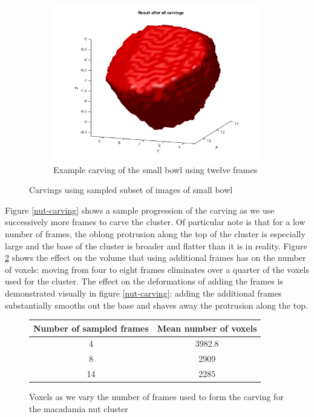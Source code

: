 \documentclass[10pt,twocolumn,letterpaper]{article}
\begin{document}
\begin{figure}
\begin{subfigure}[t]{0.3\textwidth}
        \centering
        \includegraphics[width=\textwidth]{bluebowl2_12.png}
        \caption{Example carving of the small bowl using twelve frames}
    \end{subfigure}
    \caption{Carvings using sampled subset of images of small bowl}
    \label{bowl-carving}
\end{figure}



Figure \ref{nut-carving} shows a sample progression of the carving as we use successively more frames to carve the cluster. Of particular note is that for a low number of frames, the oblong protrusion along the top of the cluster is especially large and the base of the cluster is broader and flatter than it is in reality. Figure \ref{nut-voxels} shows the effect on the volume that using additional frames has on the number of voxels: moving from four to eight frames eliminates over a quarter of the voxels used for the cluster. The effect on the deformations of adding the frames is demonstrated visually in figure \ref{nut-carving}: adding the additional frames substantially smooths out the base and shaves away the protrusion along the top.

\begin{figure}[H]
    \centering
    \begin{tabular}{|c|c|}
    \hline
    Number of sampled frames & Mean number of voxels \\
    \hline
    4 & 3982.8 \\
    8 & 2909 \\
    14 & 2285 \\
    \hline
    \end{tabular}
    \caption{Voxels as we vary the number of frames used to form the carving for the macadamia nut cluster}
    \label{nut-voxels}
\end{figure}
\end{document}
